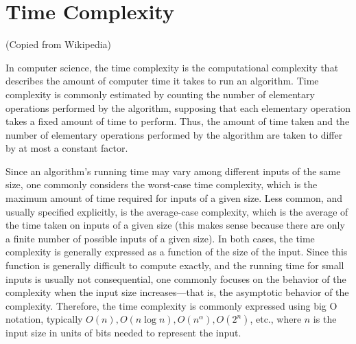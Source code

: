 \chapter{Time Complexity}

(Copied from Wikipedia)

In computer science, the time complexity is the computational complexity that describes the amount of computer time it takes to run an algorithm. Time complexity is commonly estimated by counting the number of elementary operations performed by the algorithm, supposing that each elementary operation takes a fixed amount of time to perform. Thus, the amount of time taken and the number of elementary operations performed by the algorithm are taken to differ by at most a constant factor.

Since an algorithm's running time may vary among different inputs of the same size, one commonly considers the worst-case time complexity, which is the maximum amount of time required for inputs of a given size. Less common, and usually specified explicitly, is the average-case complexity, which is the average of the time taken on inputs of a given size (this makes sense because there are only a finite number of possible inputs of a given size). In both cases, the time complexity is generally expressed as a function of the size of the input. Since this function is generally difficult to compute exactly, and the running time for small inputs is usually not consequential, one commonly focuses on the behavior of the complexity when the input size increases—that is, the asymptotic behavior of the complexity. Therefore, the time complexity is commonly expressed using big O notation, typically $O(n), O(n\log n), O(n^{\alpha }), O(2^{n})$, etc., where $n$ is the input size in units of bits needed to represent the input.

